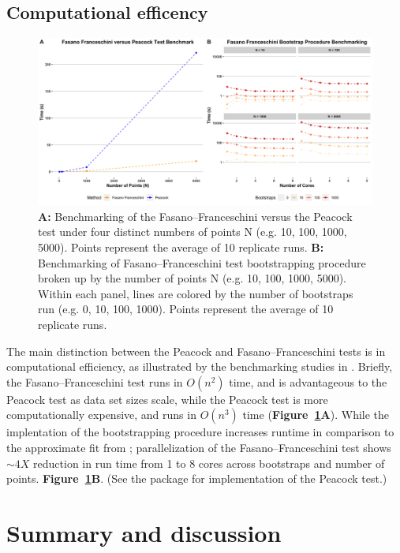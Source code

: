 \documentclass[codesnippet]{jss}
\begin{document}
\subsection{Computational efficency}

\begin{figure}[hbt]
\centering
\includegraphics{benchmark}
\caption{\label{fig:bmark} \textbf{A:} Benchmarking of the Fasano--Franceschini versus the Peacock test under four distinct numbers of points N (e.g. 10, 100, 1000, 5000). Points represent the average of 10 replicate runs. \textbf{B:} Benchmarking of Fasano--Franceschini test bootstrapping procedure broken up by the number of points N (e.g. 10, 100, 1000, 5000). Within each panel, lines are colored by the number of bootstraps run (e.g. 0, 10, 100, 1000). Points represent the average of 10 replicate runs.
}
\end{figure}

The main distinction between the Peacock and Fasano--Franceschini tests is in computational efficiency, as
illustrated by the benchmarking studies in \cite{Lopes2007}. Briefly,
the Fasano--Franceschini test runs in $O(n^2)$ time, and is advantageous to the Peacock test as data set sizes scale, while the Peacock test is more computationally expensive, and runs in $O(n^3)$ time (\textbf{Figure~\ref{fig:bmark}A}). While the implentation of the bootstrapping procedure increases runtime in comparison to the approximate fit from  \citep{numericalRecipes}; parallelization of the Fasano--Franceschini test shows $\sim 4X$ reduction in run time from 1 to 8 cores across bootstraps and number of points. \textbf{Figure~\ref{fig:bmark}B}.
%
(See the  package for  implementation of the Peacock test.)



\section{Summary and discussion} \label{sec:summary}
\end{document}
